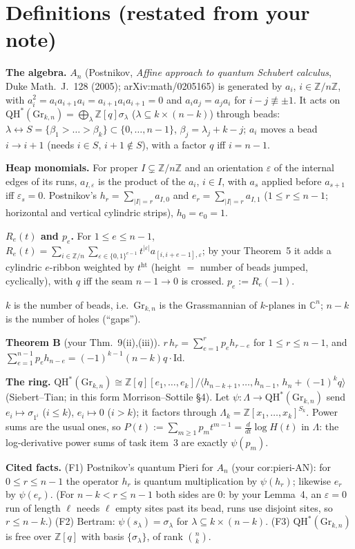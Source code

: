 \documentclass[11pt]{article}
\theoremstyle{remark}
\newcommand{\QH}{\mathrm{QH}^*(\mathrm{Gr}_{k,n})}
\newcommand{\Z}{\mathbb{Z}}
\DeclareMathOperator{\hgt}{ht}
\begin{document}
\section{Definitions (restated from your note)}

\textbf{The algebra.} $A_n$ (Postnikov, \emph{Affine approach to quantum Schubert calculus},
Duke Math.\ J.\ 128 (2005); arXiv:math/0205165) is generated by $a_i$, $i\in\Z/n\Z$, with
$a_i^2=a_ia_{i+1}a_i=a_{i+1}a_ia_{i+1}=0$ and $a_ia_j=a_ja_i$ for $i-j\not\equiv\pm1$.
It acts on $\QH=\bigoplus_\lambda \Z[q]\sigma_\lambda$ ($\lambda\subseteq k\times(n-k)$) through beads:
$\lambda\leftrightarrow S=\{\beta_1>\dots>\beta_k\}\subset\{0,\dots,n-1\}$, $\beta_j=\lambda_j+k-j$;
$a_i$ moves a bead $i\to i+1$ (needs $i\in S$, $i+1\notin S$), with a factor $q$ iff $i=n-1$.

\textbf{Heap monomials.} For proper $I\subsetneq\Z/n\Z$ and an orientation $\varepsilon$ of the internal edges of
its runs, $a_{I,\varepsilon}$ is the product of the $a_i$, $i\in I$, with $a_s$ applied before $a_{s+1}$ iff
$\varepsilon_s=0$.
Postnikov's $h_r=\sum_{|I|=r}a_{I,0}$ and $e_r=\sum_{|I|=r}a_{I,1}$ ($1\le r\le n-1$; horizontal and
vertical cylindric strips), $h_0=e_0=1$.

\textbf{$R_e(t)$ and $p_e$.} For $1\le e\le n-1$,
$R_e(t)=\sum_{i\in\Z/n}\sum_{\varepsilon\in\{0,1\}^{e-1}}t^{|\varepsilon|}a_{[i,i+e-1],\varepsilon}$;
by your Theorem~5 it adds a cylindric $e$-ribbon weighted by $t^{\hgt}$ (height $=$ number of beads jumped,
cyclically), with $q$ iff the seam $n-1\to0$ is crossed. $p_e:=R_e(-1)$.

\textbf{$k$} is the number of beads, i.e.\ $\mathrm{Gr}_{k,n}$ is the Grassmannian of $k$-planes in $\mathbb{C}^n$;
$n-k$ is the number of holes (``gaps'').

\textbf{Theorem B} (your Thm.~9(ii),(iii)). $r\,h_r=\sum_{e=1}^r p_e h_{r-e}$ for $1\le r\le n-1$, and
$\sum_{e=1}^{n-1}p_e h_{n-e}=(-1)^{k-1}(n-k)q\cdot\mathrm{Id}$.

\textbf{The ring.} $\QH\cong\Z[q][e_1,\dots,e_k]/\langle h_{n-k+1},\dots,h_{n-1},\,h_n+(-1)^kq\rangle$
(Siebert--Tian; in this form Morrison--Sottile \S4). Let $\psi:\Lambda\to\QH$ send $e_i\mapsto\sigma_{1^i}$
($i\le k$), $e_i\mapsto0$ ($i>k$); it factors through $\Lambda_k=\Z[x_1,\dots,x_k]^{S_k}$. Power sums are
the usual ones, so $P(t):=\sum_{m\ge1}p_mt^{m-1}=\frac{d}{dt}\log H(t)$ in $\Lambda$: the log-derivative
power sums of task item~3 are exactly $\psi(p_m)$.

\textbf{Cited facts.}
(F1) Postnikov's quantum Pieri for $A_n$ (your cor:pieri-AN): for $0\le r\le n-1$ the operator $h_r$ is quantum
multiplication by $\psi(h_r)$; likewise $e_r$ by $\psi(e_r)$. (For $n-k<r\le n-1$ both sides are $0$:
by your Lemma~4, an $\varepsilon=0$ run of length $\ell$ needs $\ell$ empty sites past its bead, runs use disjoint
sites, so $r\le n-k$.)
(F2) Bertram: $\psi(s_\lambda)=\sigma_\lambda$ for $\lambda\subseteq k\times(n-k)$.
(F3) $\QH$ is free over $\Z[q]$ with basis $\{\sigma_\lambda\}$, of rank $\binom nk$.
\end{document}
